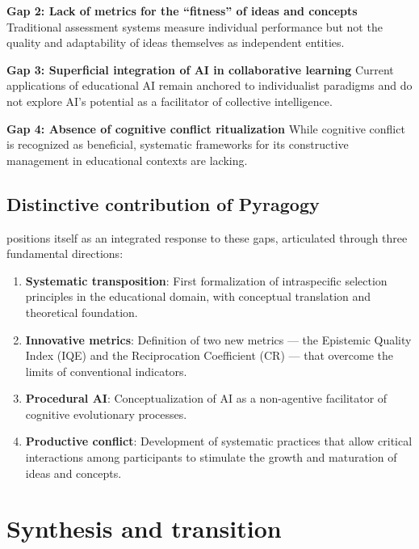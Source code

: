 \textbf{Gap 2: Lack of metrics for the ``fitness'' of ideas and concepts}
Traditional assessment systems measure individual performance but not the quality and adaptability of ideas themselves as independent entities.

\textbf{Gap 3: Superficial integration of AI in collaborative learning}
Current applications of educational AI remain anchored to individualist paradigms and do not explore AI's potential as a facilitator of collective intelligence.

\textbf{Gap 4: Absence of cognitive conflict ritualization}
While cognitive conflict is recognized as beneficial, systematic frameworks for its constructive management in educational contexts are lacking.

\subsection{Distinctive contribution of Pyragogy}

\pyragogy{} positions itself as an integrated response to these gaps, articulated through three fundamental directions:

\begin{enumerate}
	\item \textbf{Systematic transposition}: First formalization of intraspecific selection principles in the educational domain, with conceptual translation and theoretical foundation.
	
	\item \textbf{Innovative metrics}: Definition of two new metrics --- the Epistemic Quality Index (IQE) and the Reciprocation Coefficient (CR) --- that overcome the limits of conventional indicators.
	
	
	\item \textbf{Procedural AI}: Conceptualization of AI as a non-agentive facilitator of cognitive evolutionary processes.
	
	\item \textbf{Productive conflict}: Development of systematic practices that allow critical interactions among participants to stimulate the growth and maturation of ideas and concepts.
	
\end{enumerate}

\section{Synthesis and transition}

